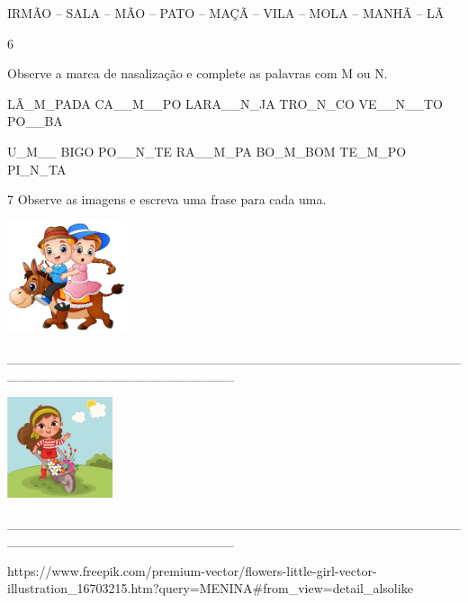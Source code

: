 {{IRMÃO -- SALA -- MÃO -- PATO -- MAÇÃ -- VILA -- MOLA -- MANHÃ -- LÃ

\num{6}

Observe a marca de nasalização e complete as palavras com M ou N.


LÂ\_M\_PADA CA\_\_M\_\_PO LARA\_\_N\_JA TRO\_N\_CO VE\_\_N\_\_TO
PO\_\_BA

U\_M\_\_ BIGO PO\_\_N\_TE RA\_\_M\_PA BO\_M\_BOM TE\_M\_PO PI\_N\_TA

\num{7} Observe as imagens e escreva uma frase para cada uma.


\includegraphics[width=1.38264in,height=1.28681in]{media/image67.jpeg}

\_\_\_\_\_\_\_\_\_\_\_\_\_\_\_\_\_\_\_\_\_\_\_\_\_\_\_\_\_\_\_\_\_\_\_\_\_\_\_\_\_\_\_\_\_\_\_\_\_\_\_\_\_\_\_\_\_\_\_\_\_\_\_\_\_\_\_\_\_\_\_\_


\includegraphics[width=1.21656in,height=1.16552in]{media/image68.jpeg}

\_\_\_\_\_\_\_\_\_\_\_\_\_\_\_\_\_\_\_\_\_\_\_\_\_\_\_\_\_\_\_\_\_\_\_\_\_\_\_\_\_\_\_\_\_\_\_\_\_\_\_\_\_\_\_\_\_\_\_\_\_\_\_\_\_\_\_\_\_\_\_\_


https://www.freepik.com/premium-vector/flowers-little-girl-vector-illustration\_16703215.htm?query=MENINA\#from\_view=detail\_alsolike

}}
